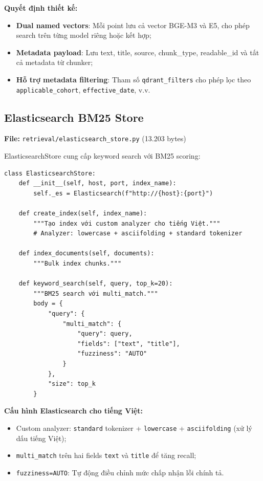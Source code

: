 \documentclass[../DoAn.tex]{subfiles}
\begin{document}
\textbf{Quyết định thiết kế:}
\begin{itemize}
    \item \textbf{Dual named vectors}: Mỗi point lưu cả vector BGE-M3 và E5, cho phép search trên từng model riêng hoặc kết hợp;
    \item \textbf{Metadata payload}: Lưu text, title, source, chunk\_type, readable\_id và tất cả metadata từ chunker;
    \item \textbf{Hỗ trợ metadata filtering}: Tham số \texttt{qdrant\_filters} cho phép lọc theo \texttt{applicable\_cohort}, \texttt{effective\_date}, v.v.
\end{itemize}

\subsection{Elasticsearch BM25 Store}
\textbf{File:} \texttt{retrieval/elasticsearch\_store.py} (13.203 bytes)

ElasticsearchStore cung cấp keyword search với BM25 scoring:
\begin{verbatim}
class ElasticsearchStore:
    def __init__(self, host, port, index_name):
        self._es = Elasticsearch(f"http://{host}:{port}")

    def create_index(self, index_name):
        """Tạo index với custom analyzer cho tiếng Việt."""
        # Analyzer: lowercase + asciifolding + standard tokenizer

    def index_documents(self, documents):
        """Bulk index chunks."""

    def keyword_search(self, query, top_k=20):
        """BM25 search với multi_match."""
        body = {
            "query": {
                "multi_match": {
                    "query": query,
                    "fields": ["text", "title"],
                    "fuzziness": "AUTO"
                }
            },
            "size": top_k
        }
\end{verbatim}

\textbf{Cấu hình Elasticsearch cho tiếng Việt:}
\begin{itemize}
    \item Custom analyzer: \texttt{standard} tokenizer + \texttt{lowercase} + \texttt{asciifolding} (xử lý dấu tiếng Việt);
    \item \texttt{multi\_match} trên hai fields \texttt{text} và \texttt{title} để tăng recall;
    \item \texttt{fuzziness=AUTO}: Tự động điều chỉnh mức chấp nhận lỗi chính tả.
\end{itemize}
\end{document}
